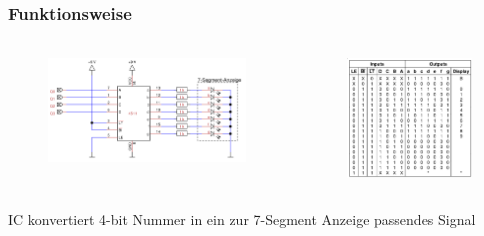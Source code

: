 \begin{frame}
    \frametitle{Funktionsweise}
    \framesubtitle{}
    \begin{columns}[c]
            \begin{figure}[H]
                \begin{center}
                        \includegraphics[scale=0.2]{./img/schaltung/bcd.png}
                \end{center}
            \end{figure}
            \begin{figure}[H]
            \begin{center}
                    \includegraphics[scale=0.2]{./img/schaltung/sieben_seg.png}
            \end{center}
            \end{figure}
    \end{columns}
    \begin{block}{}
            IC konvertiert 4-bit Nummer in ein
            zur 7-Segment Anzeige passendes Signal
    \end{block}
\end{frame}
